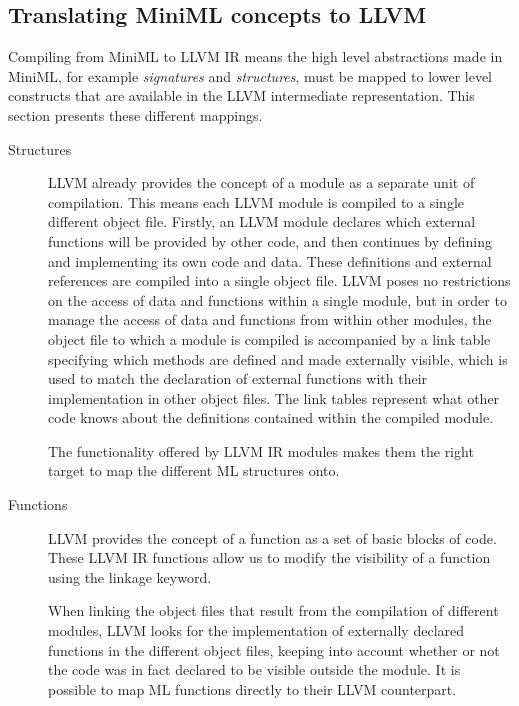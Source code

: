 \documentclass[10pt,a4paper,master=cws, masteroption=ai,english,inputenc=utf8]{kulemt}
\begin{document}
\subsection{Translating MiniML concepts to LLVM}
Compiling from \mbox{MiniML} to LLVM IR means the high level abstractions made in \mbox{MiniML}, for example \emph{signatures} and \emph{structures}, must be mapped to lower level constructs that are available in the LLVM intermediate representation.
This section presents these different mappings.

\begin{description}
\item[Structures]
LLVM already provides the concept of a module as a separate unit of compilation. This means each LLVM module is compiled to a single different object file. Firstly, an LLVM module declares which external functions will be provided by other code, and then continues by defining and implementing its own code and data. These definitions and external references are compiled into a single object file. LLVM poses no restrictions on the access of data and functions within a single module, but in order to manage the access of data and functions from within other modules, the object file to which a module is compiled is accompanied by a link table specifying which methods are defined and made externally visible, which is used to match the declaration of external functions with their implementation in other object files. The link tables represent what other code knows about the definitions contained within the compiled module.



The functionality offered by LLVM IR modules makes them the right target  to map the different ML structures onto.

\item[Functions]
LLVM provides the concept of a function as a set of basic blocks of code. 
These LLVM IR functions allow us to modify the visibility of a function using the linkage keyword. 

When linking the object files that result from the compilation of different modules, LLVM looks for the implementation of externally declared functions in the different object files, keeping into account whether or not the code was in fact declared to be visible outside the module. It is possible to map ML functions directly to their LLVM counterpart.


\end{description}
\end{document}
